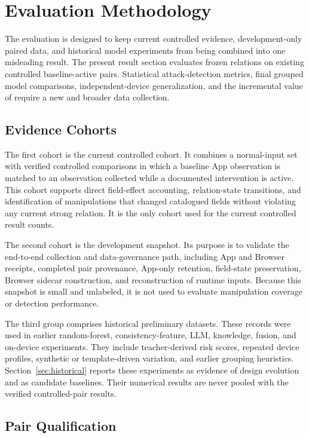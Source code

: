 \section{Evaluation Methodology}
\label{sec:methodology}

The evaluation is designed to keep current controlled evidence, development-only paired data, and historical model experiments from being combined into one misleading result. The present result section evaluates frozen \appfp relations on existing controlled baseline-active pairs. Statistical attack-detection metrics, final grouped model comparisons, independent-device generalization, and the incremental value of \browserfp require a new and broader data collection.

\subsection{Evidence Cohorts}

The first cohort is the current controlled \appfp cohort. It combines a normal-input set with verified controlled comparisons in which a baseline App observation is matched to an observation collected while a documented intervention is active. This cohort supports direct field-effect accounting, relation-state transitions, and identification of manipulations that changed catalogued fields without violating any current strong relation. It is the only cohort used for the current controlled result counts.

The second cohort is the development \pairedfp snapshot. Its purpose is to validate the end-to-end collection and data-governance path, including App and Browser receipts, completed pair provenance, App-only retention, field-state preservation, Browser sidecar construction, and reconstruction of runtime inputs. Because this snapshot is small and unlabeled, it is not used to evaluate manipulation coverage or detection performance.

The third group comprises historical preliminary datasets. These records were used in earlier random-forest, consistency-feature, LLM, knowledge, fusion, and on-device experiments. They include teacher-derived risk scores, repeated device profiles, synthetic or template-driven variation, and earlier grouping heuristics. Section~\ref{sec:historical} reports these experiments as evidence of design evolution and as candidate baselines. Their numerical results are never pooled with the verified controlled-pair results.

\subsection{Pair Qualification}

